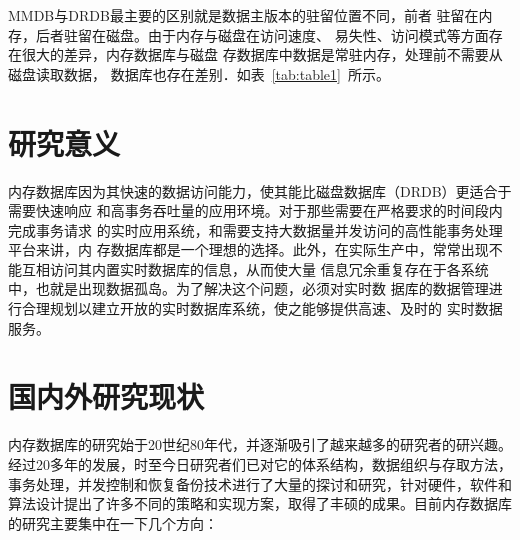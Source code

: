 \documentclass[literaturereview]{zjutreport}
\begin{document}
MMDB与DRDB最主要的区别就是数据主版本的驻留位置不同，前者
驻留在内存，后者驻留在磁盘。由于内存与磁盘在访问速度、
易失性、访问模式等方面存在很大的差异，内存数据库与磁盘
存数据库中数据是常驻内存，处理前不需要从磁盘读取数据， 数据库也存在差别．如表~\ref{tab:table1}~所示。

\begin{table}[htbp]
\caption{MMDB和DRDB的比较}\label{tab:table1}
\vspace{\baselineskip}
\end{table}

\chapter{研究意义}
内存数据库因为其快速的数据访问能力，使其能比磁盘数据库（DRDB）更适合于需要快速响应
和高事务吞吐量的应用环境。对于那些需要在严格要求的时间段内完成事务请求
的实时应用系统，和需要支持大数据量并发访问的高性能事务处理平台来讲，内
存数据库都是一个理想的选择。此外，在实际生产中，常常出现不能互相访问其内置实时数据库的信息，从而使大量
信息冗余重复存在于各系统中，也就是出现数据孤岛。为了解决这个问题，必须对实时数
据库的数据管理进行合理规划以建立开放的实时数据库系统，使之能够提供高速、及时的
实时数据服务。

\chapter{国内外研究现状}
内存数据库的研究始于20世纪80年代，并逐渐吸引了越来越多的研究者的研兴趣。经过20多年的发展，时至今日研究者们已对它的体系结构，数据组织与存取方法，事务处理，并发控制和恢复备份技术进行了大量的探讨和研究，针对硬件，软件和算法设计提出了许多不同的策略和实现方案，取得了丰硕的成果。目前内存数据库的研究主要集中在一下几个方向：
\end{document}
